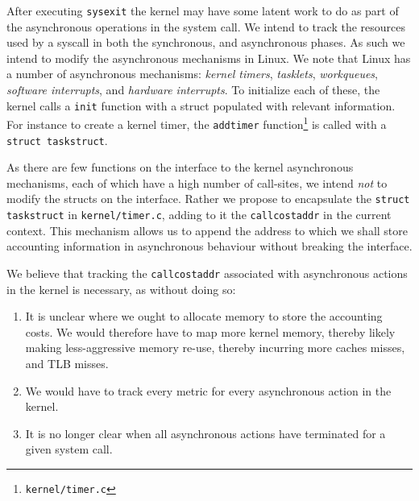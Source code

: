\documentclass[12pt]{article}
\def\_{\textunderscore\-}
\begin{document}
  After executing \texttt{sysexit} the kernel may have some latent work to do as part of the asynchronous operations in the system call. We intend to track the resources used by a syscall in both the synchronous, and asynchronous phases. As such we intend to modify the asynchronous mechanisms in Linux.  We note that Linux has a number of asynchronous mechanisms: \emph{kernel timers}, \emph{tasklets}, \emph{workqueues}, \emph{software interrupts}, and \emph{hardware interrupts}. To initialize each of these, the kernel calls a \texttt{\_\_init} function with a struct populated with relevant information. For instance to create a kernel timer, the \texttt{add\_timer} function\footnote{\texttt{kernel/timer.c}} is called with a \texttt{struct task\_struct}.

  As there are few functions on the interface to the kernel asynchronous mechanisms, each of which have a high number of call-sites, we intend \emph{not} to modify the structs on the interface.
  Rather we propose to encapsulate the \texttt{struct task\_struct} in \texttt{kernel/timer.c}, adding to it the \texttt{call\_cost\_addr} in the current context.
  This mechanism allows us to append the address to which we shall store accounting information in asynchronous behaviour without breaking the interface.

  We believe that tracking the \texttt{call\_cost\_addr} associated with asynchronous actions in the kernel is necessary, as without doing so:
  \begin{enumerate}
  \item It is unclear where we ought to allocate memory to store the accounting costs. We would therefore have to map more kernel memory, thereby likely making less-aggressive memory re-use, thereby incurring more caches misses, and TLB misses.
  \item We would have to track every metric for every asynchronous action in the kernel.
  \item It is no longer clear when all asynchronous actions have terminated for a given system call.
  \end{enumerate}
\end{document}

